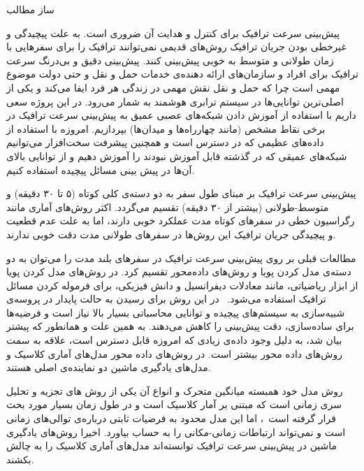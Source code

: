\documentclass{article}
\begin{document}
\setLTRbibitems{}

‌ساز
‌مطالب

پیش‌بینی سرعت ترافیک برای کنترل و هدایت آن ضروری است.
به علت پیچیدگی و غیرخطی بودن جریان ترافیک روش‌های قدیمی نمی‌توانند ترافیک را برای سفرهایی با زمان طولانی و متوسط به خوبی پیش‌بینی کنند.
پیش‌بینی دقیق و بی‌درنگ سرعت ترافیک برای افراد و سازمان‌های ارائه دهنده‌ی خدمات حمل و نقل و حتی دولت موضوع مهمی است چرا که حمل و نقل نقش مهمی در زندگی هر فرد ایفا می‌کند و یکی از اصلی‌ترین توانایی‌ها در سیستم ترابری هوشمند  به شمار می‌رود.
در این پروژه سعی داریم با استفاده از آموزش دادن شبکه‌های عصبی عمیق به پیش‌بینی سرعت ترافیک در برخی نقاط مشخص (مانند چهارراه‌ها و میدان‌ها) بپردازیم.
امروزه با استفاده از داده‌های عظیمی که در دسترس است و همچنین پیشرفت سخت‌افزار می‌توانیم شبکه‌های عمیقی که در گذشته قابل آموزش نبودند را آموزش دهیم و از توانایی بالای آن‌ها در پیش بینی مسائل پیچیده استفاده کنیم.

پیش‌بینی سرعت ترافیک بر مبنای طول سفر به دو دسته‌ی کلی کوتاه (۵ تا ۳۰ دقیقه) ‌و متوسط-طولانی (بیشتر از ۳۰ دقیقه) تقسیم می‌گردد. اکثر روش‌های آماری مانند رگراسیون خطی در سفرهای کوتاه مدت عملکرد خوبی دارند، اما به علت عدم قطعیت و پیچیدگی جریان ترافیک این روش‌ها در سفرهای طولانی مدت دقت خوبی ندارند.~

مطالعات قبلی بر روی پیش‌بینی سرعت ترافیک در سفرهای بلند مدت را می‌توان به دو دسته‌ی مدل کردن پویا و روش‌های داده‌محور تقسیم کرد.
در روش‌های مدل کردن پویا از ابزار ریاضیاتی، مانند معادلات دیفرانسیل و دانش فیزیکی، برای فرموله کردن مسائل ترافیک استفاده می‌شود.~
در این روش برای رسیدن به حالت پایدار در پروسه‌ی شبیه‌سازی به سیستم‌های پیچیده و توانایی محاسباتی بسیار بالا نیاز است و فرضیه‌ها برای ساده‌سازی، دقت پیش‌بینی را کاهش می‌دهند.
به همین علت و همانطور که پیشتر بیان شد، به دلیل وجود داده‌ی زیادی که امروزه قابل دسترس است، علاقه به سمت روش‌های داده محور بیشتر است.
در روش‌های داده محور مدل‌های آماری کلاسیک و مدل‌های یادگیری ماشین دو نماینده‌ی اصلی هستند.

روش مدل خود همبسته میانگین متحرک و انواع آن یکی از روش های تجزیه و تحلیل سری زمانی است که مبتنی بر آمار کلاسیک است
و در طول زمان بسیار مورد بحث قرار گرفته است~،
اما این مدل محدود به فرضیات ثابتی درباره‌ی توالی‌های زمانی است و نمی‌تواند ارتباطات زمانی-مکانی را به حساب بیاورد.
اخیرا روش‌های یادگیری ماشین در پیش‌بینی سرعت ترافیک توانسته‌اند مدل‌های آماری کلاسیک را به چالش بکشند.
\end{document}
